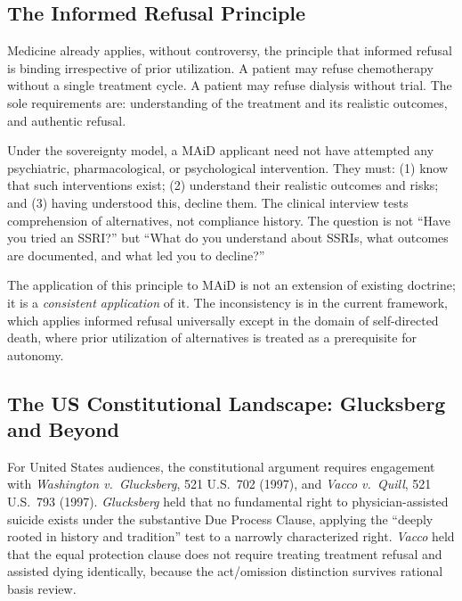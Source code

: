 \documentclass[11pt, letterpaper]{article}
\begin{document}
\subsection{The Informed Refusal Principle}

Medicine already applies, without controversy, the principle that informed refusal is
binding irrespective of prior utilization. A patient may refuse chemotherapy without
a single treatment cycle. A patient may refuse dialysis without trial. The sole
requirements are: understanding of the treatment and its realistic outcomes, and
authentic refusal.

\begin{policybox}[title={\sffamily\bfseries\small\color{C@accent}
  The Informed Refusal Standard Applied to MAiD}]
Under the sovereignty model, a MAiD applicant need not have attempted any psychiatric,
pharmacological, or psychological intervention. They must: (1) know that such
interventions exist; (2) understand their realistic outcomes and risks; and
(3) having understood this, decline them. The clinical interview tests comprehension
of alternatives, not compliance history. The question is not ``Have you tried an
SSRI?'' but ``What do you understand about SSRIs, what outcomes are documented, and
what led you to decline?''
\end{policybox}

The application of this principle to MAiD is not an extension of existing doctrine;
it is a \textit{consistent application} of it. The inconsistency is in the current
framework, which applies informed refusal universally except in the domain of
self-directed death, where prior utilization of alternatives is treated as a
prerequisite for autonomy.

\subsection{The US Constitutional Landscape: Glucksberg and Beyond}

For United States audiences, the constitutional argument requires engagement with
\textit{Washington v.\ Glucksberg}, 521 U.S.\ 702 (1997), and \textit{Vacco v.\ Quill},
521 U.S.\ 793 (1997). \textit{Glucksberg} held that no fundamental right to
physician-assisted suicide exists under the substantive Due Process Clause, applying
the ``deeply rooted in history and tradition'' test to a narrowly characterized right.
\textit{Vacco} held that the equal protection clause does not require treating treatment
refusal and assisted dying identically, because the act/omission distinction survives
rational basis review.
\end{document}
